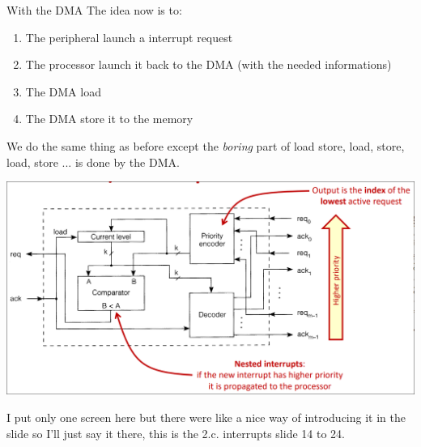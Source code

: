 \begin{parag}{With the DMA}
    The idea now is to:
	\begin{enumerate}
	    \item The peripheral launch a interrupt request
	    \item The processor launch it back to the DMA (with the needed informations)
	    \item The DMA load 
	    \item The DMA store it to the memory
	\end{enumerate}
	We do the same thing as before except the \textit{boring} part of load store, load, store, load, store ... is done by the DMA.
	\begin{center}
	\includegraphics[scale=0.2]{screenshots/2025-10-22_16.png}
	\end{center}
	\begin{framedremark}
	I put only one screen here but there were like a nice way of introducing it in the slide so I'll just say it there, this is the 2.c. interrupts slide 14 to 24.
	\end{framedremark}
\end{parag}
